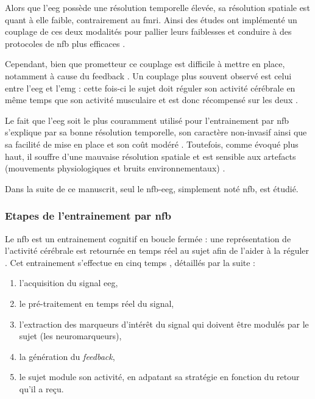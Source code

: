 Alors que l'\gls{eeg} possède une résolution temporelle élevée, sa résolution spatiale est quant à elle faible, 
contrairement au \gls{fmri}. Ainsi des études ont implémenté un couplage de ces deux modalités pour pallier leurs faiblesses et conduire à des 
protocoles de \gls{nfb} plus efficaces \citep{Perronnet2017}. 

Cependant, bien que prometteur ce couplage est difficile à mettre en place, notamment à cause du feedback .
Un couplage plus souvent observé est celui entre l'\gls{eeg} et l'\gls{emg} : cette fois-ci le sujet doit réguler son activité cérébrale en même temps que son
activité musculaire et est donc récompensé sur les deux \citep{Bink2014}.

Le fait que l'\gls{eeg} soit le plus couramment utilisé pour l'entrainement par \gls{nfb} s'explique par sa bonne résolution temporelle, son caractère non-invasif
ainsi que sa facilité de mise en place et son coût modéré \citep{Fovet2016}. Toutefois, comme évoqué plus haut, il souffre d'une mauvaise résolution 
spatiale et est sensible aux artefacts (mouvements physiologiques et bruits environnementaux) \citep{Iwasaki2005, Goncharova2003}. 

Dans la suite de ce manuscrit, seul le \gls{nfb}-\gls{eeg}, simplement noté \gls{nfb}, est étudié. 

\subsubsection{Etapes de l'entrainement par \gls{nfb}} \label{steps_NFB_taining}

Le \gls{nfb} est un entrainement cognitif en boucle fermée : une représentation de l'activité cérébrale est retournée en temps réel
au sujet afin de l'aider à la réguler \citep{Enriquez2017}. Cet entrainement s'effectue en cinq temps \citep{Enriquez2017}, détaillés
par la suite :
\begin{enumerate}
\item l'acquisition du signal \gls{eeg}, 
\item le pré-traitement en temps réel du signal,
\item l'extraction des marqueurs d'intérêt du signal qui doivent être modulés par le sujet (les neuromarqueurs),
\item la génération du \textit{feedback},
\item le sujet module son activité, en adpatant sa stratégie en fonction du retour qu'il a reçu. 
\end{enumerate}

